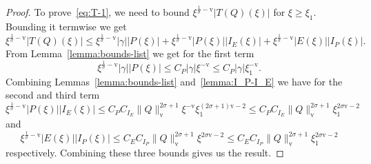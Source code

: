 \documentclass[11pt]{article}
\newcommand{\normv}{\mathrm{v}}
\begin{document}
\begin{proof}
  To prove~\eqref{eq:T-1}, we need to bound
  \(\xi^{\frac{1}{\sigma} - \normv}|T(Q)(\xi)|\) for
  \(\xi \geq \xi_{1}\). Bounding it termwise we get
  \begin{equation*}
    \xi^{\frac{1}{\sigma} - \normv}|T(Q)(\xi)| \leq
    \xi^{\frac{1}{\sigma} - \normv}|\gamma||P(\xi)|
    + \xi^{\frac{1}{\sigma} - \normv}|P(\xi)||I_{E}(\xi)|
    + \xi^{\frac{1}{\sigma} - \normv}|E(\xi)||I_{P}(\xi)|.
  \end{equation*}
  From Lemma~\ref{lemma:bounds-list} we get for the first term
  \begin{equation*}
    \xi^{\frac{1}{\sigma} - \normv}|\gamma||P(\xi)| \leq C_{P}|\gamma|\xi^{-\normv} \leq C_{P}|\gamma|\xi_{1}^{-\normv}.
  \end{equation*}
  Combining Lemmas~\ref{lemma:bounds-list} and~\ref{lemma:I_P-I_E} we
  have for the second and third term
  \begin{equation*}
    \xi^{\frac{1}{\sigma} - \normv}|P(\xi)||I_{E}(\xi)|
    \leq C_{P}C_{I_{E}}\|Q\|_{\normv}^{2\sigma + 1}\xi^{-\normv}\xi_{1}^{(2\sigma + 1)\normv - 2}
    \leq C_{P}C_{I_{E}}\|Q\|_{\normv}^{2\sigma + 1}\xi_{1}^{2\sigma\normv - 2}
  \end{equation*}
  and
  \begin{equation*}
    \xi^{\frac{1}{\sigma} - \normv}|E(\xi)||I_{P}(\xi)|
    \leq C_{E}C_{I_{P}}\|Q\|_{\normv}^{2\sigma + 1}\xi^{2\sigma\normv - 2}
    \leq C_{E}C_{I_{P}}\|Q\|_{\normv}^{2\sigma + 1}\xi_{1}^{2\sigma\normv - 2}
  \end{equation*}
  respectively. Combining these three bounds gives us the result.


\end{proof}
\end{document}
